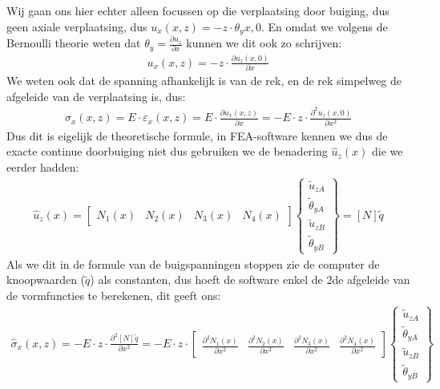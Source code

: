 \documentclass[a4paper,11pt,twoside]{report}
\begin{document}
Wij gaan ons hier echter alleen focussen op die verplaatsing door buiging, dus geen axiale
verplaatsing, dus $u_x(x,z) = -z \cdot \theta_y{x,0}$. En omdat we volgens de Bernoulli theorie
weten dat $\theta_y = \frac{\partial u_z}{\partial x}$ kunnen we dit ook zo schrijven:
\begin{align*}
    u_x(x,z) = -z \cdot \frac{\partial u_z(x,0)}{\partial x}
\end{align*}
We weten ook dat de spanning afhankelijk is van de rek, en de rek simpelweg de afgeleide van de
verplaatsing is, dus:
\begin{align*}
    \sigma_x(x,z) = E \cdot \varepsilon_x(x,z) = E \cdot \frac{\partial u_x(x,z)}{\partial x} = -E \cdot z \cdot \frac{\partial^2 u_z(x,0)}{\partial x^2}
\end{align*}
Dus dit is eigelijk de theoretische formule, in FEA-software kennen we dus de exacte continue
doorbuiging niet dus gebruiken we de benadering $\hat{u}_z(x)$ die we eerder hadden:
\begin{align*}
    \hat{u}_z(x) =
    \begin{bmatrix}
        N_1(x) & N_2(x) & N_3(x) & N_4(x)
    \end{bmatrix}
    \begin{Bmatrix}
        \tilde{u}_{zA}      \\
        \tilde{\theta}_{yA} \\
        \tilde{u}_{zB}      \\
        \tilde{\theta}_{yB}
    \end{Bmatrix}
    =
    [N] \tilde{q}
\end{align*}
Als we dit in de formule van de buigspanningen stoppen zie de computer de knoopwaarden ($\tilde{q}$)
als constanten, dus hoeft de software enkel de 2de afgeleide van de vormfuncties te berekenen, dit
geeft ons:
\begin{align*}
    \hat{\sigma}_x(x,z) = -E \cdot z \cdot \frac{\partial^2 [N]\tilde{q}}{\partial x^2} = -E \cdot z \cdot
    \begin{bmatrix}
        \frac{\partial^2 N_1(x)}{\partial x^2} & \frac{\partial^2 N_2(x)}{\partial x^2} & \frac{\partial^2 N_3(x)}{\partial x^2} & \frac{\partial^2 N_4(x)}{\partial x^2}
    \end{bmatrix}
    \begin{Bmatrix}
        \tilde{u}_{zA}      \\
        \tilde{\theta}_{yA} \\
        \tilde{u}_{zB}      \\
        \tilde{\theta}_{yB}
    \end{Bmatrix}
\end{align*}
\end{document}
